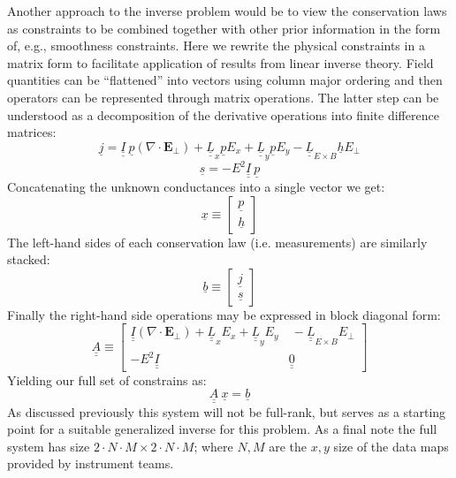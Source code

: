 \documentclass[11pt,letterpaper]{article}
\begin{document}
Another approach to the inverse problem would be to view the conservation laws as constraints to be combined together with other prior information in the form of, e.g., smoothness constraints.  Here we rewrite the physical constraints in a matrix form to facilitate application of results from linear inverse theory.  Field quantities can be ``flattened'' into vectors using column major ordering and then operators can be represented through matrix operations.  The latter step can be understood as a decomposition of the derivative operations into finite difference matrices:
\begin{equation}
\underline{j} = \underline{\underline{I}} ~ \underline{p} \left( \nabla \cdot \mathbf{E}_\perp \right) + \underline{\underline{L}}_x \underline{p} E_x + \underline{\underline{L}}_y \underline{p} E_y - \underline{\underline{L}}_{E \times B} \underline{h} E_\perp
\end{equation}
\begin{equation}
\underline{s} = - E^2 \underline{\underline{I}} ~ \underline{p}
\end{equation}
Concatenating the unknown conductances into a single vector we get:
\begin{equation}
\underline{x} \equiv \left[ \begin{array}{c} \underline{p} \\ \underline{h} \end{array} \right]
\end{equation}
The left-hand sides of each conservation law (i.e. measurements) are similarly stacked:
\begin{equation}
\underline{b} \equiv \left[ \begin{array}{c} \underline{j} \\ \underline{s} \end{array} \right]
\end{equation}
Finally the right-hand side operations may be expressed in block diagonal form:
\begin{equation}
\underline{\underline{A}} \equiv \left[ \begin{array}{cc} \underline{\underline{I}}  \left( \nabla \cdot \mathbf{E}_\perp \right) +  \underline{\underline{L}}_x  E_x + \underline{\underline{L}}_y E_y  & ~ -\underline{\underline{L}}_{E \times B} E_\perp \\ -E^2 \underline{\underline{I}} & \underline{\underline{0}} \end{array} \right]
\end{equation}
Yielding our full set of constrains as:
\begin{equation}
\underline{\underline{A}} ~ \underline{x} = \underline{b}
\end{equation}
As discussed previously this system will not be full-rank, but serves as a starting point for a suitable generalized inverse for this problem.  As a final note the full system has size $2 \cdot N \cdot M \times 2 \cdot N \cdot M$; where $N,M$ are the $x,y$ size of the data maps provided by instrument teams.  
\end{document}
